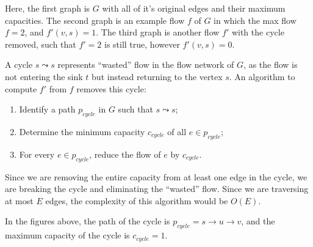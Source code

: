 \documentclass{article}
\begin{document}
\begin{enumerate}
    Here, the first graph is $G$ with all of it's original edges and their
    maximum capacities. The second graph is an example flow $f$ of $G$ in which
    the max flow $f=2$, and $f'(v,s)=1$. The third graph is another flow $f'$
    with the cycle removed, such that $f'=2$ is still true, however $f'(v,s)=0$.

    A cycle $s\leadsto s$ represents ``wasted'' flow in the flow network of $G$,
    as the flow is not entering the sink $t$ but instead returning to the vertex
    $s$. An algorithm to compute $f'$ from $f$ removes this cycle:

    \begin{enumerate}
        \item Identify a path $p_{cycle}$ in $G$ such that $s\leadsto s$;
        \item Determine the minimum capacity $c_{cycle}$ of all $e \in p_{cycle}$;
        \item For every $e \in p_{cycle}$, reduce the flow of $e$ by
        $c_{cycle}$.
    \end{enumerate}

    Since we are removing the entire capacity from at least one edge in the
    cycle, we are breaking the cycle and eliminating the ``wasted'' flow. Since
    we are traversing at most $E$ edges, the complexity of this algorithm would
    be $O(E)$.

    In the figures above, the path of the cycle is $p_{cycle} = s \rightarrow u
    \rightarrow v$, and the maximum capacity of the cycle is $c_{cycle} = 1$.


\end{enumerate}
\end{document}
